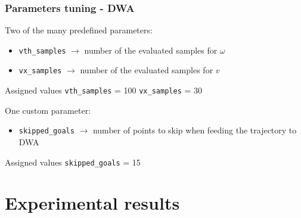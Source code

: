\documentclass{beamer}
\begin{document}

\begin{frame}[allowframebreaks]
\frametitle{Parameters tuning - DWA}

Two of the many predefined parameters:
\begin{itemize}
  \item \texttt{vth\_samples} $\rightarrow$ number of the evaluated samples for $\omega$
  \item \texttt{vx\_samples} $\rightarrow$ number of the evaluated samples for $v$
\end{itemize}

\vspace{2em}

\begin{block}{Assigned values}
\centering
\texttt{vth\_samples} = 100
\hspace{2em}
\texttt{vx\_samples} = 30
\end{block}

\framebreak

One custom parameter:
\begin{itemize}
  \item \texttt{skipped\_goals} $\rightarrow$ number of points to skip when feeding the trajectory to DWA
\end{itemize}

\vspace{2em}

\begin{block}{Assigned values}
\centering
\texttt{skipped\_goals} = 15
\end{block}

\end{frame}




\section{Experimental results}


\end{document}
